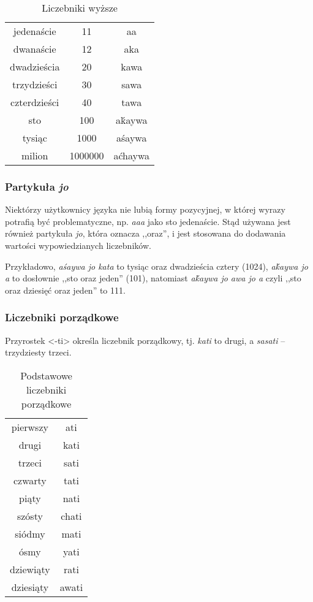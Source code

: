 \begin{spacing}{1.1}
\begin{table}[ht]
	\centering
	\caption{Liczebniki wyższe}
	\begin{tabular}{ccc} \toprule
		jedenaście & 11 & aa \\
		dwanaście & 12 & aka \\
		dwadzieścia & 20 & kawa \\
		trzydzieści & 30 & sawa \\
		czterdzieści & 40 & tawa \\
		sto & 100 & aḱaywa  \\
		tysiąc & 1000 & aśaywa \\
		milion & 1000000 & aćhaywa \\\bottomrule
	\end{tabular}
	\label{tab:numerals2}
\end{table}

\subsubsection{Partykuła \emph{jo}}

Niektórzy użytkownicy języka nie lubią formy pozycyjnej, w której wyrazy
potrafią być problematyczne, np. \emph{aaa} jako sto jedenaście. Stąd używana
jest również partykuła \emph{jo}, która oznacza ,,oraz'', i jest stosowana do
dodawania wartości wypowiedzianych liczebników.

Przykładowo, \emph{aśaywa jo kata} to tysiąc oraz dwadzieścia cztery (1024),
\emph{aḱaywa jo a} to dosłownie ,,sto oraz jeden'' (101), natomiast
\emph{aḱaywa jo awa jo a} czyli ,,sto oraz dziesięć oraz jeden'' to 111.

\subsubsection{Liczebniki porządkowe}

Przyrostek <-ti> określa liczebnik porządkowy, tj. \emph{kati} to drugi, a
\emph{sasati} -- trzydziesty trzeci.

\begin{table}[ht]
\centering
\caption{Podstawowe liczebniki porządkowe}
\begin{tabular}{cc} \toprule
	pierwszy & ati \\
	drugi & kati \\
	trzeci & sati \\
	czwarty & tati \\
	piąty & nati \\
	szósty & chati \\
	siódmy & mati \\
	ósmy & yati \\
	dziewiąty & rati \\
	dziesiąty & awati \\\bottomrule
\end{tabular}
\label{tab:numerals3}
\end{table}


\end{spacing}
